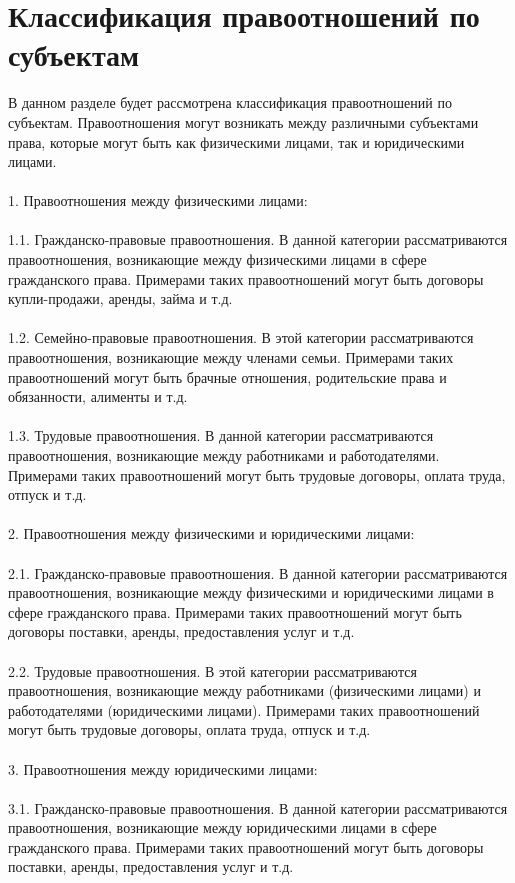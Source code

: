 \documentclass{article}
\begin{document}
\newpage
\section{Классификация правоотношений по субъектам}
В данном разделе будет рассмотрена классификация правоотношений по субъектам. Правоотношения могут возникать между различными субъектами права, которые могут быть как физическими лицами, так и юридическими лицами.\\
~\\
1. Правоотношения между физическими лицами:\\
~\\
1.1. Гражданско-правовые правоотношения. В данной категории рассматриваются правоотношения, возникающие между физическими лицами в сфере гражданского права. Примерами таких правоотношений могут быть договоры купли-продажи, аренды, займа и т.д.\\
~\\
1.2. Семейно-правовые правоотношения. В этой категории рассматриваются правоотношения, возникающие между членами семьи. Примерами таких правоотношений могут быть брачные отношения, родительские права и обязанности, алименты и т.д.\\
~\\
1.3. Трудовые правоотношения. В данной категории рассматриваются правоотношения, возникающие между работниками и работодателями. Примерами таких правоотношений могут быть трудовые договоры, оплата труда, отпуск и т.д.\\
~\\
2. Правоотношения между физическими и юридическими лицами:\\
~\\
2.1. Гражданско-правовые правоотношения. В данной категории рассматриваются правоотношения, возникающие между физическими и юридическими лицами в сфере гражданского права. Примерами таких правоотношений могут быть договоры поставки, аренды, предоставления услуг и т.д.\\
~\\
2.2. Трудовые правоотношения. В этой категории рассматриваются правоотношения, возникающие между работниками (физическими лицами) и работодателями (юридическими лицами). Примерами таких правоотношений могут быть трудовые договоры, оплата труда, отпуск и т.д.\\
~\\
3. Правоотношения между юридическими лицами:\\
~\\
3.1. Гражданско-правовые правоотношения. В данной категории рассматриваются правоотношения, возникающие между юридическими лицами в сфере гражданского права. Примерами таких правоотношений могут быть договоры поставки, аренды, предоставления услуг и т.д.\\
\end{document}
